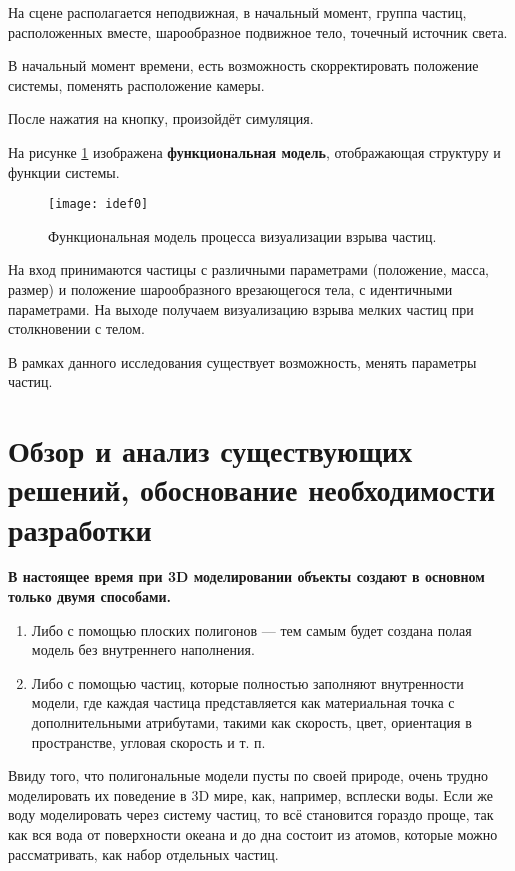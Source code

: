 На сцене располагается неподвижная, в начальный момент, группа частиц, расположенных вместе, шарообразное подвижное тело, точечный источник света.
	
В начальный момент времени, есть возможность скорректировать положение системы, поменять расположение камеры.
	
После нажатия на кнопку, произойдёт симуляция.

На рисунке \ref{img:idef0} изображена \textbf{функциональная модель}, отображающая структуру и функции системы. 

\begin{figure}[H]
	\centering
	\texttt{[image: idef0]}
	\caption{Функциональная модель процесса визуализации взрыва частиц. }
	\label{img:idef0}
\end{figure}

На вход принимаются частицы с различными параметрами (положение, масса, размер) и положение шарообразного врезающегося тела, с идентичными параметрами. На выходе получаем визуализацию взрыва мелких частиц при столкновении с телом. 

В рамках данного исследования существует возможность, менять параметры частиц. 

\section{\textbf{Обзор и анализ существующих решений, обоснование необходимости разработки}}

\textbf{В настоящее время при 3D моделировании объекты создают в основном только двумя способами.} \cite{3dgraphic}
\begin{enumerate}
	\item[1. ] Либо с помощью плоских полигонов — тем самым будет создана полая модель без внутреннего наполнения. 
	\item[2. ] Либо с помощью частиц, которые полностью заполняют внутренности модели, где каждая частица представляется как материальная точка с дополнительными атрибутами, такими как скорость, цвет, ориентация в пространстве, угловая скорость и т. п.
\end{enumerate}

Ввиду того, что полигональные модели пусты по своей природе, очень трудно моделировать их поведение в 3D мире, как, например, всплески воды. Если же воду моделировать через систему частиц, то всё становится гораздо проще, так как вся вода от поверхности океана и до дна состоит из атомов, которые можно рассматривать, как набор отдельных частиц.

